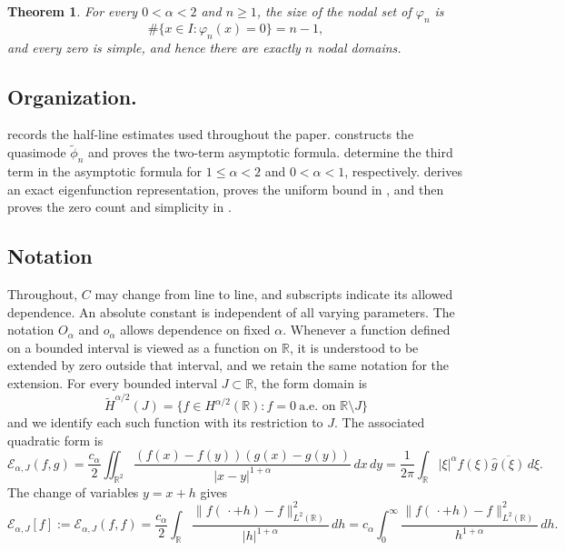 \documentclass[11pt]{amsart}
\numberwithin{equation}{section}
\newtheorem{theorem}{Theorem}[section]
\theoremstyle{remark}
\newcommand{\R}{\mathbb R}
\newcommand{\wt}{\widetilde}
\newcommand{\norm}[2][]{\lVert #2\rVert_{#1}}
\newcommand{\abs}[1]{\lvert #1\rvert}
\newcommand{\calE}{\mathcal E}
\begin{document}
\begin{theorem}\label{thm:nodal}
For every $0<\alpha<2$ and $n\ge1$, the size of the nodal set of $\varphi_n$ is 
\begin{equation}
	\#\{x\in I:\varphi_n(x)=0\}=n-1,
\end{equation}
and every zero is simple, and hence there are exactly $n$ nodal domains.
\end{theorem}

\subsection{Organization.}
 records the half-line estimates used throughout the paper.   constructs the quasimode $\wt\phi_n$ and proves the two-term asymptotic formula.   determine the third term in the asymptotic formula for $1\le\alpha<2$ and $0<\alpha<1$, respectively.   derives an exact eigenfunction representation, proves the uniform bound in , and then proves the zero count and simplicity in .
\subsection{Notation}
Throughout, $C$ may change from
line to line, and subscripts indicate its allowed dependence.  An absolute
constant is independent of all varying parameters.  The notation $O_\alpha$
and $o_\alpha$ allows dependence on fixed $\alpha$. Whenever a function defined on a bounded interval is viewed as a function on $\R$, it
is understood to be extended by zero outside that interval, and we retain the
same notation for the extension.  For every bounded interval $J\subset\R$, the form domain is
\[
\wt H^{\alpha/2}(J)
=\{f\in H^{\alpha/2}(\R):f=0\ \text{a.e. on }\R\setminus J\}
\]
and we identify each such function with its restriction to $J$.  The associated quadratic form is
\begin{equation}\label{eq:form}
	\calE_{\alpha,J}(f,g)=\frac{c_\alpha}{2}\iint_{\R^2}
	\frac{(f(x)-f(y))(g(x)-g(y))}
	{\abs{x-y}^{1+\alpha}}\,dx\,dy
	=\frac1{2\pi}\int_\R\abs\xi^\alpha
	\widehat f(\xi)\overline{\widehat g(\xi)}\,d\xi.
\end{equation}
The change
of variables $y=x+h$ gives 
\begin{equation}\label{eq:translation-form}
	\calE_{\alpha,J}[f]:=\calE_{\alpha,J}(f,f)=\frac{c_\alpha}{2}\int_\R
	\frac{\norm[L^2(\R)]{f(\,\cdot+h)-f}^2}{\abs h^{1+\alpha}}\,dh
	=c_\alpha\int_0^\infty
	\frac{\norm[L^2(\R)]{f(\,\cdot+h)-f}^2}{h^{1+\alpha}}\,dh.
\end{equation}
\end{document}
